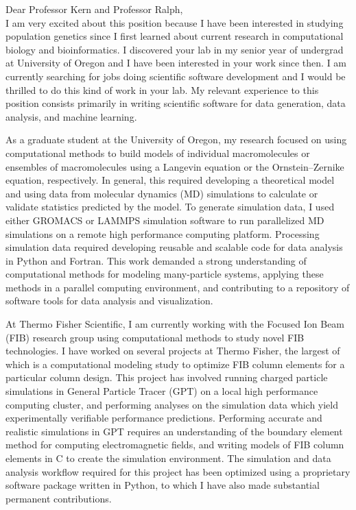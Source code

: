 \documentclass[]{letter}
\begin{document}

Dear Professor Kern and Professor Ralph, \\

I am very excited about this position because I have been interested in studying population genetics since I first learned about current research in computational biology and bioinformatics. I discovered your lab in my senior year of undergrad at University of Oregon and I have been interested in your work since then. I am currently searching for jobs doing scientific software development and I would be thrilled to do this kind of work in your lab. My relevant experience to this position consists primarily in writing scientific software for data generation, data analysis, and machine learning. 

As a graduate student at the University of Oregon, my research focused on using computational methods to build models of individual macromolecules or ensembles of macromolecules using a Langevin equation or the Ornstein–Zernike equation, respectively. In general, this required developing a theoretical model and using data from molecular dynamics (MD) simulations to calculate or validate statistics predicted by the model. To generate simulation data, I used either GROMACS or LAMMPS simulation software to run parallelized MD simulations on a remote high performance computing platform. Processing simulation data required developing reusable and scalable code for data analysis in Python and Fortran. This work demanded a strong understanding of computational methods for modeling many-particle systems, applying these methods in a parallel computing environment, and contributing to a repository of software tools for data analysis and visualization.

At Thermo Fisher Scientific, I am currently working with the Focused Ion Beam (FIB) research group using computational methods to study novel FIB technologies. I have worked on several projects at Thermo Fisher, the largest of which is a computational modeling study to optimize FIB column elements for a particular column design. This project has involved running charged particle simulations in General Particle Tracer (GPT) on a local high performance computing cluster, and performing analyses on the simulation data which yield experimentally verifiable performance predictions. Performing accurate and realistic simulations in GPT requires an understanding of the boundary element method for computing electromagnetic fields, and writing models of FIB column elements in C to create the simulation environment. The simulation and data analysis workflow required for this project has been optimized using a proprietary software package written in Python, to which I have also made substantial permanent contributions. 
\end{document}
